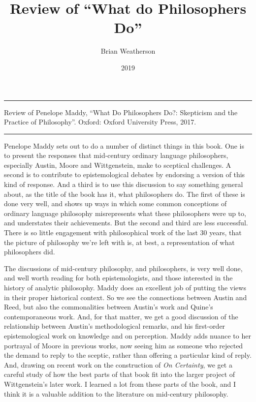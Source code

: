\documentclass[
  10pt,
  letterpaper,
  DIV=11,
  numbers=noendperiod,
  twoside]{scrartcl}
\title{Review of ``What do Philosophers Do''}
\author{Brian Weatherson}
\date{2019}
\renewenvironment{abstract}
 {\vspace{-1.25cm}
 \quotation\small\noindent\rule{\linewidth}{.5pt}\par\smallskip
 \noindent }
 {\par\noindent\rule{\linewidth}{.5pt}\endquotation}
\begin{document}
\maketitle
\begin{abstract}
Review of Penelope Maddy, ``What Do Philosophers Do?: Skepticism and the
Practice of Philosophy''. Oxford: Oxford University Press, 2017.
\end{abstract}


Penelope Maddy sets out to do a number of distinct things in this book.
One is to present the responses that mid-century ordinary language
philosophers, especially Austin, Moore and Wittgenstein, make to
sceptical challenges. A second is to contribute to epistemological
debates by endorsing a version of this kind of response. And a third is
to use this discussion to say something general about, as the title of
the book has it, what philosophers do. The first of these is done very
well, and shows up ways in which some common conceptions of ordinary
language philosophy misrepresents what these philosophers were up to,
and understates their achievements. But the second and third are less
successful. There is so little engagement with philosophical work of the
last 30 years, that the picture of philosophy we're left with is, at
best, a representation of what philosophers did.

The discussions of mid-century philosophy, and philosophers, is very
well done, and well worth reading for both epistemologists, and those
interested in the history of analytic philosophy. Maddy does an
excellent job of putting the views in their proper historical context.
So we see the connections between Austin and Reed, but also the
commonalities between Austin's work and Quine's contemporaneous work.
And, for that matter, we get a good discussion of the relationship
between Austin's methodological remarks, and his first-order
epistemological work on knowledge and on perception. Maddy adds nuance
to her portrayal of Moore in previous works, now seeing him as someone
who rejected the demand to reply to the sceptic, rather than offering a
particular kind of reply. And, drawing on recent work on the
construction of \emph{On Certainty}, we get a careful study of how the
best parts of that book fit into the larger project of Wittgenstein's
later work. I learned a lot from these parts of the book, and I think it
is a valuable addition to the literature on mid-century philosophy.
\end{document}
